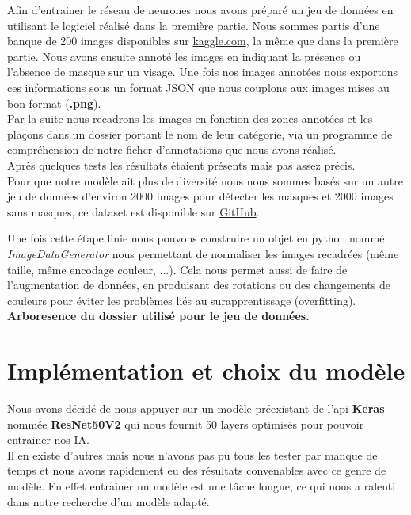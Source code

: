 Afin d'entrainer le réseau de neurones nous avons préparé un jeu de données en utilisant le logiciel réalisé dans la première partie. Nous sommes partis d'une banque de 200 images disponibles sur \href{https://www.kaggle.com/swann00/masque-vs-sans-masque}{kaggle.com}, la même que dans la première partie.
Nous avons ensuite annoté les images en indiquant la présence ou l'absence de masque sur un visage.
Une fois nos images annotées nous exportons ces informations sous un format JSON que nous couplons aux images mises au bon format (\textbf{.png}).\\
Par la suite nous recadrons les images en fonction des zones annotées et les plaçons dans un dossier portant le nom de leur catégorie, via un programme de compréhension de notre ficher d'annotations que nous avons réalisé.  \\
Après quelques tests les résultats étaient présents mais pas assez précis. \\
Pour que notre modèle ait plus de diversité nous nous sommes basés sur un autre jeu de données d'environ 2000 images pour détecter les masques et 2000 images sans masques, ce dataset est disponible sur \href{https://github.com/balajisrinivas/Face-Mask-Detection/tree/master/dataset}{GitHub}.

Une fois cette étape finie nous pouvons construire un objet en python nommé \textit{ImageDataGenerator} nous permettant de normaliser les images recadrées (même taille, même encodage couleur, ...). Cela nous permet aussi de faire de l'augmentation de données, en produisant des rotations ou des changements de couleurs pour éviter les problèmes liés au surapprentissage (overfitting). \\

\textbf{Arboresence du dossier utilisé pour le jeu de données.}

\section{Implémentation et choix du modèle}

Nous avons décidé de nous appuyer sur un modèle préexistant de l'api \textbf{Keras} nommée \textbf{ResNet50V2} qui nous fournit 50 layers optimisés pour pouvoir entrainer nos IA. \\
Il en existe d'autres mais nous n'avons pas pu tous les tester par manque de temps et nous avons rapidement eu des résultats convenables avec ce genre de modèle.
En effet entrainer un modèle est une tâche longue, ce qui nous a ralenti dans notre recherche d'un modèle adapté.

